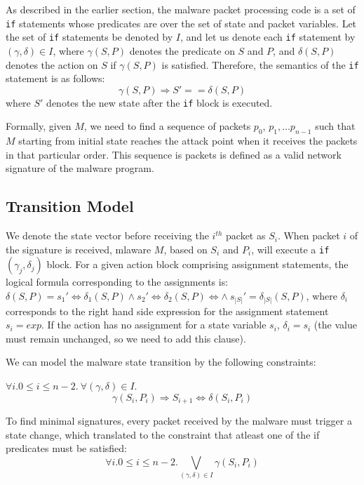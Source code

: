 \documentclass[twocolumn, 11pt]{paper}
\begin{document}
As described in the earlier section, the malware
packet processing code is a set of \texttt{if} 
statements whose predicates are over the set of state
and packet variables. Let the set of \texttt{if} 
statements be denoted by $I$, and let us denote each \texttt{if} 
statement by $(\gamma, \delta) \in I$, where $\gamma(S,P)$
denotes the predicate on $S$ and $P$, and $\delta(S,P)$ denotes
the action on $S$ if $\gamma(S,P)$ is satisfied. Therefore,
the semantics of the \texttt{if} statement is as follows:
\begin{equation}
\gamma(S,P) \Rightarrow S' == \delta(S,P)
\end{equation}
where $S'$ denotes the new state after the \texttt{if} 
block is executed. 

Formally, given $M$, we need to find a sequence of packets $p_0$,
$p_1, \ldots p_{n-1}$ such that $M$ starting from initial
state reaches the attack point when it receives the packets in
that particular order. This sequence is packets is defined as a 
valid network signature of the malware program.

\subsection{Transition Model}
We denote the state
vector before receiving the $i^{th}$ packet as $S_i$.
When packet $i$ of the signature is received, 
mlaware $M$, based on $S_i$ and $P_{i}$, will execute 
a \texttt{if} $(\gamma_j, \delta_j)$ block.
For a given action block comprising  
assignment statements, the logical formula corresponding to
the assignments is: 
$\delta(S,P) = s_1' \Leftrightarrow \delta_1(S,P) \wedge s_2' \Leftrightarrow  \delta_2(S,P) \Leftrightarrow  \wedge ~s_{|S|}' = \delta_{|S|}(S,P)$, 
where $\delta_i$ corresponds to the right hand side
expression for the assignment statement $s_i = exp$.
If the action has no assignment for a state 
variable $s_i$, $\delta_i = s_i$ (the value must 
remain unchanged, so we need to add this clause).

We can model the malware state transition 
by the following constraints: 

$\forall i. 0 \leq i \leq n-2.~\forall (\gamma, \delta) \in I.~$
\begin{equation}
\gamma(S_i, P_{i}) \Rightarrow S_{i+1} \Leftrightarrow \delta(S_i, P_{i})
\end{equation}

To find minimal signatures, every packet received by the malware 
must trigger a state change, which translated to the constraint
that atleast one of the if predicates must be satisfied: 
\begin{equation}
\forall i. 0 \leq i \leq n-2. \bigvee_{(\gamma, \delta) \in I} \gamma(S_i, P_{i})
\end{equation}
\end{document}
